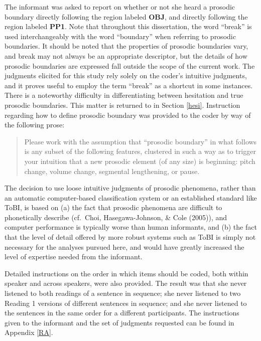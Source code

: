 \documentclass[11pt,oneside]{book}
\begin{document}
The informant was asked to report on whether or not she heard a prosodic boundary directly following the region labeled \textbf{OBJ}, and directly following the region labeled \textbf{PP1}. Note that throughout this dissertation, the word ``break'' is used interchangeably with the word ``boundary'' when referring to prosodic boundaries. It should be noted that the properties of prosodic boundaries vary, and break may not always be an appropriate descriptor, but the details of how prosodic boundaries are expressed fall outside the scope of the current work. The judgments elicited for this study rely solely on the coder's intuitive judgments, and it proves useful to employ the term ``break'' as a shortcut in some instances. There is a noteworthy difficulty in differentiating between hesitation and true prosodic boundaries. This matter is returned to in Section \ref{hesi}. Instruction regarding how to define prosodic boundary was provided to the coder by way of the following prose:

\begin{quote}
Please work with the assumption that ``prosodic boundary'' in what follows is any subset of the following features, clustered in such a way as to trigger your intuition that a new prosodic element (of any size) is beginning: pitch change, volume change, segmental lengthening, or pause.
\end{quote}

The decision to use loose intuitive judgments of prosodic phenomena, rather than an automatic computer-based classification system or an established standard like ToBI, is based on (a) the fact that prosodic phenomena are difficult to phonetically describe (cf.~Choi, Hasegawa-Johnson, \& Cole (2005)), and computer performance is typically worse than human informants, and (b) the fact that the level of detail offered by more robust systems such as ToBI is simply not necessary for the analyses pursued here, and would have greatly increased the level of expertise needed from the informant.

Detailed instructions on the order in which items should be coded, both within speaker and across speakers, were also provided. The result was that she never listened to both readings of a sentence in sequence; she never listened to two Reading 1 versions of different sentences in sequence; and she never listened to the sentences in the same order for a different participants. The instructions given to the informant and the set of judgments requested can be found in Appendix \ref{RA}.
\end{document}
